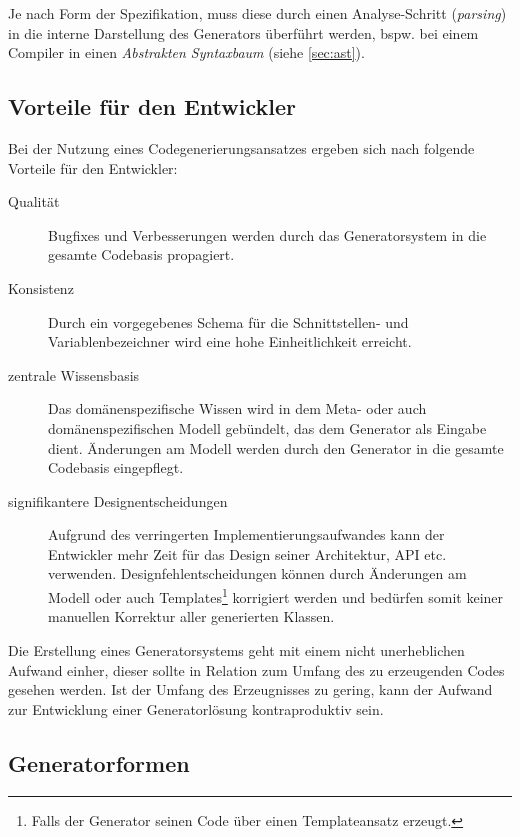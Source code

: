 Je nach Form der Spezifikation, muss diese durch einen Analyse-Schritt (\emph{parsing}) in die interne Darstellung des Generators überführt werden, bspw. bei einem Compiler in einen \emph{Abstrakten Syntaxbaum} (siehe \cref{sec:ast}).

\subsection{Vorteile für den Entwickler}
\label{sec:advantages_for_the_developer}

Bei der Nutzung eines Codegenerierungsansatzes ergeben sich nach \cite[][S. 15]{herrington2003code} folgende Vorteile für den Entwickler:

\begin{description}
    \item[Qualität]
        Bugfixes und Verbesserungen werden durch das Generatorsystem in die gesamte Codebasis propagiert.
    \item[Konsistenz]
        Durch ein vorgegebenes Schema für die Schnittstellen- und Variablenbezeichner wird eine hohe Einheitlichkeit erreicht.
    \item[zentrale Wissensbasis]
        Das domänenspezifische Wissen wird in dem Meta- oder auch domänenspezifischen Modell gebündelt, das dem Generator als Eingabe dient. Änderungen am Modell werden durch den Generator in die gesamte Codebasis eingepflegt.
    \item[signifikantere Designentscheidungen]
        Aufgrund des verringerten Implementierungsaufwandes kann der Entwickler mehr Zeit für das Design seiner Architektur, API etc. verwenden. Designfehlentscheidungen können durch Änderungen am Modell oder auch Templates\footnote{Falls der Generator seinen Code über einen Templateansatz erzeugt.} korrigiert werden und bedürfen somit keiner manuellen Korrektur aller generierten Klassen.
\end{description}

Die Erstellung eines Generatorsystems geht mit einem nicht unerheblichen Aufwand einher, dieser sollte in Relation zum Umfang des zu erzeugenden Codes gesehen werden.
Ist der Umfang des Erzeugnisses zu gering, kann der Aufwand zur Entwicklung einer Generatorlösung kontraproduktiv sein.

\subsection{Generatorformen}
\label{sec:generator_models}

